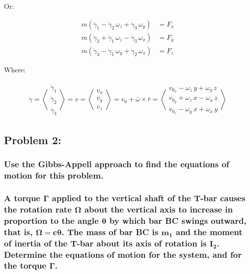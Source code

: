 \documentclass[12pt, letterpaper]{../assignment}
\begin{document}
Or:

\begin{answer}
  \begin{equation*}
    \begin{aligned}
    m\left({\ddot{\gamma} }_1 -{\dot{\gamma} }_2 \,\omega_z +{\dot{\gamma} }_3 \,\omega_y\right) &= F_x \\
    m\left({\ddot{\gamma} }_2 +{\dot{\gamma} }_1 \,\omega_z -{\dot{\gamma} }_3 \,\omega_x\right) &= F_y \\
    m\left({\ddot{\gamma} }_3 -{\dot{\gamma} }_1 \,\omega_y +{\dot{\gamma} }_2 \,\omega_x\right) &= F_z
    \end{aligned}
    \end{equation*}
\end{answer}

Where:

\begin{equation*}
    \begin{aligned}
      \dot{\gamma} =
      \left<\begin{array}{c} \dot{\gamma}_1 \\ \dot{\gamma}_2 \\ \dot{\gamma}_3  \end{array}\right>
      = v =
      \left<\begin{array}{c} v_x \\ v_y \\ v_z  \end{array}\right>
      = v_0 + \bar{\omega} \times \bar{r}
      = \left<\begin{array}{c}
        v_{0_x} -\omega_z \,y+\omega_y \,z\\
        v_{0_y} +\omega_z \,x-\omega_x \,z\\
        v_{0_z} -\omega_y \,x+\omega_x \,y
        \end{array}\right> 
    \end{aligned}
\end{equation*}

\subsection*{Problem 2:}
\subsubsection*{Use the Gibbs-Appell approach to find the equations of motion for this problem.}
\subsubsection*{A torque $\bm{\Gamma}$ applied to the vertical shaft of the T-bar
causes the rotation rate $\bm{\Omega}$ about the vertical axis to increase in proportion to the angle $\bm{\theta}$ by which bar BC swings outward,
that is, $\bm{\Omega = c\theta}$.
The mass of bar BC is $\bm{m_1}$ and the moment of inertia of the T-bar about its axis of rotation is $\bm{I_2}$.
Determine the equations of motion for the system, and for the torque $\bm{\Gamma}$.}
\end{document}
